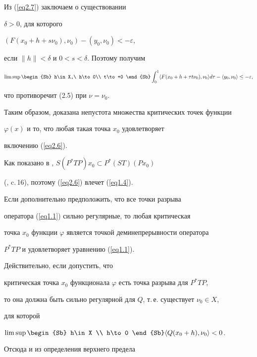 Из (\ref{eq2.7}) заключаем о существовании


$\delta >0$, для которого


$(F(x_0+h+s\nu_0),\nu_0)-(y_0,\nu_0)<-\varepsilon$,


если $\| h\| <\delta$ и $0<s<\delta$. Поэтому получим


$$


\limsup\begin{Sb} h\in X,\ h\to 0\\ t\to +0 \end{Sb}


\int_0^1 \langle F (x_0+h+\tau t\nu_0 ),\nu_0 \rangle d\tau -


\langle y_0,\nu_0 \rangle \le -\varepsilon,


$$


что противоречит (2.5) при $\nu =\nu_0$.





Таким образом, доказана непустота множества критических точек функции


$\varphi (x)$ и то, что любая такая точка $x_0$ удовлетворяет


включению (\ref{eq2.6}).


Как показано в \cite{n21}, $S(P^*TP)x_0\subset P^*( ST)(Px_0)$


(\cite{n20}, c.\,16), поэтому (\ref{eq2.6}) влечет (\ref{eq1.4}).


Если дополнительно предположить, что все точки разрыва


оператора (\ref{eq1.1}) сильно регулярные, то любая критическая


точка $x_0$ функции $\varphi$ является точкой деминепрерывности оператора


$P^*TP$ и удовлетворяет уравнению (\ref{eq1.1}).


Действительно, если допустить, что


критическая точка $x_0$ функционала $\varphi$ есть точка разрыва для $P^*TP$,


то она должна быть сильно регулярной для $Q$, т.\,е. существует $\nu_0\in X$,


для которой 


$\limsup\limits\begin{Sb} h\in X \\ h\to 0 \end{Sb}


\langle Q (x_0+h ),\nu_0 \rangle < 0$.


Отсюда и из определения верхнего предела


